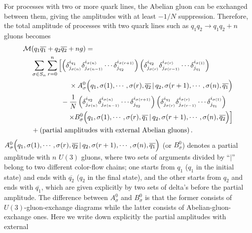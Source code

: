 \documentclass[a4paper,11pt]{article}
\begin{document}
For processes with two or more quark lines, the Abelian gluon can be
exchanged between them, giving the amplitudes with at
least $-1/N$
suppression.  Therefore, the total amplitude of processes with two quark lines such as  $q_1q_2\rightarrow q_1q_2+n$ gluons becomes
\begin{align}
{\cal M}&(q_1\overline{q_1}+q_2\overline{q_2}+ng)=\nonumber\\
&\sum_{\sigma\in S_n}\sum_{r=0}^n\left[\left(\delta^{i_{q_1}}_{j_{\sigma(n)}}
\delta^{i_{\sigma(n)}}_{j_{\sigma(n-1)}}\cdots\delta^{i_{\sigma(r+1)}}_{j_{q_2}}\right)
\left(\delta^{i_{q_2}}_{j_{\sigma(r)}}
\delta^{i_{\sigma(r)}}_{j_{\sigma(r-1)}}\cdots\delta^{i_{\sigma(1)}}_{j_{q_1}}\right)\right.\nonumber\\
&\hspace{5.5em}\times A^0_{\sigma}\Bigl(q_1,\sigma(1),\cdots,\sigma(r),\overline{q_2}\,|\,q_2,\sigma(r+1),\cdots,\sigma(n),\overline{q_1}
\Bigr)\nonumber\\
\vspace{2em}
&\hspace{4.3em}-\frac{1}{N}\left(\delta^{i_{q_2}}_{j_{\sigma(n)}}
\delta^{i_{\sigma(n)}}_{j_{\sigma(n-1)}}\cdots\delta^{i_{\sigma(r+1)}}_{j_{q_2}}\right)
\left(\delta^{i_{q_1}}_{j_{\sigma(r)}}
\delta^{i_{\sigma(r)}}_{j_{\sigma(r-1)}}\cdots\delta^{i_{\sigma(1)}}_{j_{q_1}}\right)
\nonumber\\
&\hspace{5.5em}\Bigl.\times B^0_{\sigma}\Bigl(q_1,\sigma(1),\cdots,\sigma(r),\overline{q_1}\,|\,q_2,\sigma(r+1),\cdots,\sigma(n),\overline{q_2}
\Bigr)\Bigr]\nonumber\\
&+\left({\rm partial\,\, amplitudes\,\, with \,\,external\,\,
 Abelian\,\, gluons}\right).
\label{eq:2qqng}
\end{align}
$A^0_{\sigma}\Bigl(q_1,\sigma(1),\cdots,\sigma(r),\overline{q_2}\,|\,q_2,\sigma(r+1),\cdots,\sigma(n),\overline{q_1}\Bigr)$
(or $B^0_{\sigma}$) denotes a partial
amplitude with $n$ $U(3)$ gluons, where two sets of arguments divided by ``$|$'' belong to
two different color-flow chains; one starts from $q_1$ ($q_1$ in the initial
state) and ends with $\overline{q_2}$ ($q_2$ in the final state), and the
other starts from $q_2$ and ends with $\overline{q_1}$, which are given
explicitly by two
sets of delta's before the partial amplitude. The difference between
$A^0_{\sigma}$ and $B^0_{\sigma}$ is that the former consists of $U(3)$-gluon-exchange diagrams
while the latter consists of Abelian-gluon-exchange ones.
Here we write down explicitly the partial amplitudes with external
\end{document}
